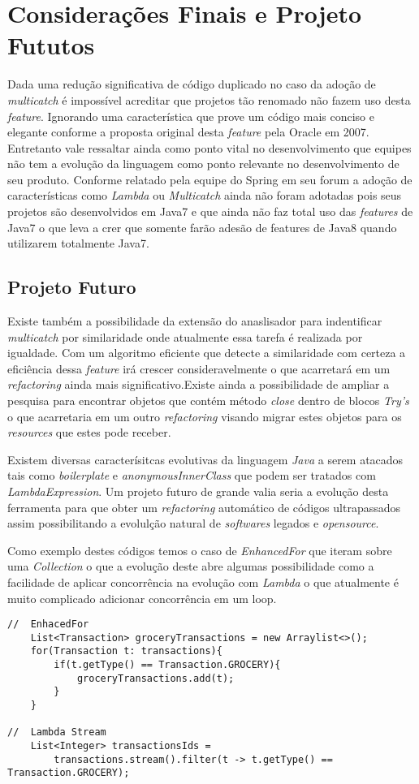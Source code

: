 \chapter{Considerações Finais e Projeto Fututos}
Dada uma redução significativa de código duplicado no caso da adoção de \textit{multicatch} é impossível acreditar que projetos tão renomado não fazem uso desta \textit{feature}. Ignorando uma característica que prove um código mais conciso e elegante conforme a proposta original desta \textit{feature} pela Oracle em 2007. Entretanto vale ressaltar ainda como ponto vital no desenvolvimento que equipes não tem a evolução da linguagem como ponto relevante no desenvolvimento de seu produto. 
Conforme relatado pela equipe do Spring em seu forum a adoção de características como \textit{Lambda} ou \textit{Multicatch} ainda não foram adotadas pois seus projetos são desenvolvidos em Java7 e que ainda não faz total uso das \textit{features} de Java7 o que leva a crer que somente farão adesão de features de Java8 quando utilizarem totalmente Java7.

\section{Projeto Futuro}
Existe também a possibilidade da extensão do anaslisador para indentificar \textit{multicatch} por similaridade onde atualmente essa tarefa é realizada por igualdade. Com um algoritmo eficiente que detecte a similaridade com certeza a eficiência dessa \textit{feature} irá crescer consideravelmente o que acarretará em um \textit{refactoring} ainda mais significativo.Existe ainda a possibilidade de ampliar a pesquisa para encontrar objetos que contém método \textit{close} dentro de blocos \textit{Try's} o que acarretaria em um outro \textit{refactoring} visando migrar estes objetos para os \textit{resources} que estes pode receber.

Existem diversas caracterísitcas evolutivas da linguagem \textit{Java} a serem atacados tais como \textit{boilerplate} e \textit{anonymousInnerClass} que podem ser tratados com \textit{LambdaExpression}. Um projeto futuro de grande valia seria a evolução desta ferramenta para que obter um \textit{refactoring} automático de códigos ultrapassados assim possibilitando a evolulção natural de \textit{softwares} legados e \textit{opensource}.

Como exemplo destes códigos temos o caso de \textit{EnhancedFor} que iteram sobre uma \textit{Collection} o que a evolução deste abre algumas possibilidade como a facilidade de aplicar concorrência na evolução com \textit{Lambda} o que atualmente é muito complicado adicionar concorrência em um loop.

\begin{lstlisting}
//	EnhacedFor
	List<Transaction> groceryTransactions = new Arraylist<>();
	for(Transaction t: transactions){
		if(t.getType() == Transaction.GROCERY){
			groceryTransactions.add(t);
		}
	}

//	Lambda Stream
	List<Integer> transactionsIds = 
		transactions.stream().filter(t -> t.getType() == Transaction.GROCERY);
\end{lstlisting}
